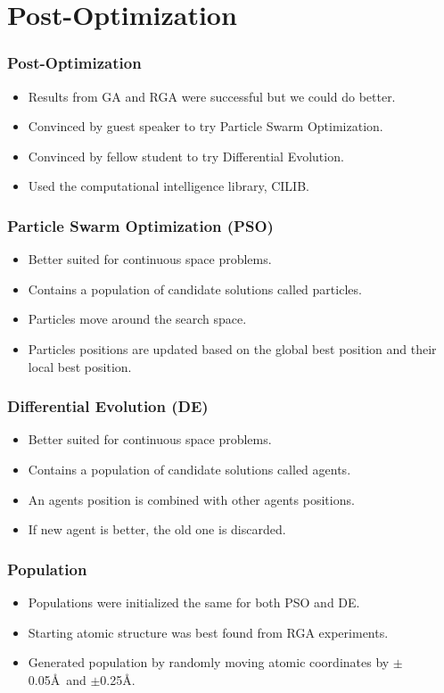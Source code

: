 \documentclass[10pt]{beamer}
\begin{document}
\section{Post-Optimization}

\begin{frame}
	\frametitle{Post-Optimization}

	\begin{itemize}
		\item Results from GA and RGA were successful but we could do better.
		\item Convinced by guest speaker to try Particle Swarm Optimization.
		\item Convinced by fellow student to try Differential Evolution.
		\item Used the computational intelligence library, CILIB.
	\end{itemize}
\end{frame}

\begin{frame}
	\frametitle{Particle Swarm Optimization (PSO)}

	\begin{itemize}
		\item Better suited for continuous space problems.
		\item Contains a population of candidate solutions called particles.
		\item Particles move around the search space.
		\item Particles positions are updated based on the global best position and their local best position.
	\end{itemize}
\end{frame}

\begin{frame}
	\frametitle{Differential Evolution (DE)}

	\begin{itemize}
		\item Better suited for continuous space problems.
		\item Contains a population of candidate solutions called agents.
		\item An agents position is combined with other agents positions.
		\item If new agent is better, the old one is discarded.
	\end{itemize}
\end{frame}

\begin{frame}
	\frametitle{Population}

	\begin{itemize}
		\item Populations were initialized the same for both PSO and DE.
		\item Starting atomic structure was best found from RGA experiments.
		\item Generated population by randomly moving atomic coordinates by $\pm$0.05\AA\ and $\pm$0.25\AA.
	\end{itemize}
\end{frame}
\end{document}
